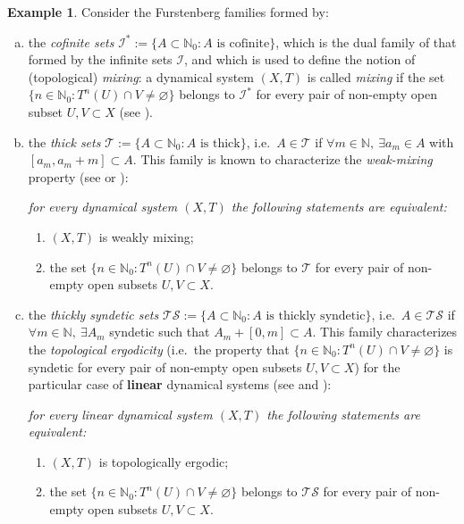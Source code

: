 \documentclass[openright,11pt]{article}
\theoremstyle{plain}
\theoremstyle{definition}
\newtheorem{example}[theorem]{Example}
\newcommand{\NN}{\mathbb{N}}
\newcommand{\Ic}{\mathcal{I}}
\newcommand{\Tc}{\mathcal{T}}
\newcommand{\TS}{\mathcal{TS}}
\begin{document}
\begin{example}\label{Exa:extra.families}
	Consider the Furstenberg families formed by:
	\begin{enumerate}[(a)]
		\item the {\em cofinite sets} $\Ic^* := \{ A \subset \NN_0 : A \text{ is cofinite} \}$, which is the dual family of that formed by the infinite sets $\Ic$, and which is used to define the notion of (topological) {\em mixing}: a dynamical system $(X,T)$ is called {\em mixing} if the set $\{ n \in \NN_0 : T^{n}(U)\cap V\neq \varnothing \}$ belongs to $\Ic^*$ for every pair of non-empty open subset $U,V \subset X$ (see \cite[Definition~1.38]{GrPe2011_book}).
		
		\item the {\em thick sets} $\Tc := \{ A \subset \NN_0 : A \text{ is thick} \}$, i.e.\ $A \in \Tc$ if $\forall m \in \NN, \ \exists a_m \in A$ with $[a_m,a_m+m] \subset A$. This family is known to characterize the {\em weak-mixing} property (see \cite[Theorem~3]{GrPe2010} or \cite[Theorem~1.54]{GrPe2011_book}): {\em for every dynamical system $(X,T)$ the following statements are equivalent:
		\begin{enumerate}[{\em(i)}]
			\item $(X,T)$ is weakly mixing;
		
			\item the set $\{ n \in \NN_0 : T^{n}(U)\cap V\neq \varnothing \}$ belongs to $\Tc$ for every pair of non-empty open subsets $U,V \subset X$.
		\end{enumerate}}
		
		\item the {\em thickly syndetic sets} $\TS := \{ A \subset \NN_0 : A \text{ is thickly syndetic} \}$, i.e.\ $A \in \TS$ if $\forall m \in \NN, \ \exists A_m$ syndetic such that $A_m+[0,m]\subset A$. This family characterizes the {\em topological ergodicity} (i.e.\ the property that $\{ n \in \NN_0 : T^{n}(U)\cap V\neq \varnothing \}$ is syndetic for every pair of non-empty open subsets $U,V \subset X$) for the particular case of \textbf{linear} dynamical systems (see \cite[Exercise~2.5.4]{GrPe2011_book} and \cite{BMPP2019}): {\em for every linear dynamical system $(X,T)$ the following statements are equivalent:
			\begin{enumerate}[{\em(i)}]
				\item $(X,T)$ is topologically ergodic;
				
				\item the set $\{ n \in \NN_0 : T^{n}(U)\cap V\neq \varnothing \}$ belongs to $\TS$ for every pair of non-empty open subsets $U,V \subset X$.
		\end{enumerate}}
		

\end{enumerate}
\end{example}
\end{document}
